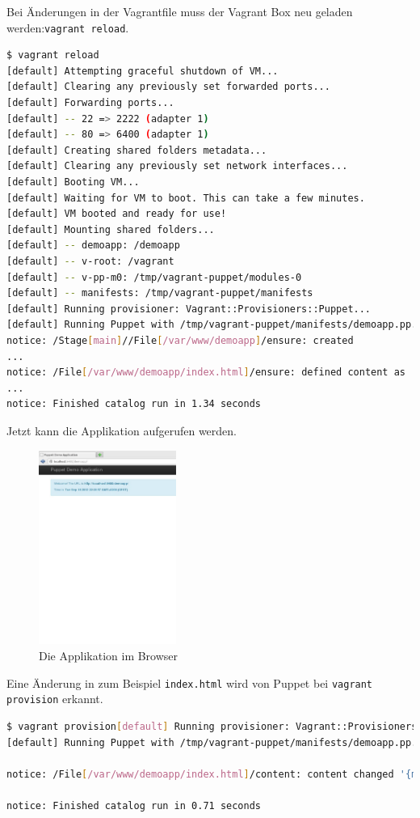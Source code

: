 \documentclass[12pt,a4paper,ngerman]{article}
\begin{document}
Bei Änderungen in der Vagrantfile muss der Vagrant Box neu geladen werden:\lstinline$vagrant reload$.
\begin{lstlisting}[language=sh,caption=Puppet reload mit Provisioning der Applikation, label=reloaddemoapp]
$ vagrant reload
[default] Attempting graceful shutdown of VM...
[default] Clearing any previously set forwarded ports...
[default] Forwarding ports...
[default] -- 22 => 2222 (adapter 1)
[default] -- 80 => 6400 (adapter 1)
[default] Creating shared folders metadata...
[default] Clearing any previously set network interfaces...
[default] Booting VM...
[default] Waiting for VM to boot. This can take a few minutes.
[default] VM booted and ready for use!
[default] Mounting shared folders...
[default] -- demoapp: /demoapp
[default] -- v-root: /vagrant
[default] -- v-pp-m0: /tmp/vagrant-puppet/modules-0
[default] -- manifests: /tmp/vagrant-puppet/manifests
[default] Running provisioner: Vagrant::Provisioners::Puppet...
[default] Running Puppet with /tmp/vagrant-puppet/manifests/demoapp.pp...
notice: /Stage[main]//File[/var/www/demoapp]/ensure: created
...
notice: /File[/var/www/demoapp/index.html]/ensure: defined content as '{md5}90a8d419b9c7b43b09ba73abebaf8f4c'
...
notice: Finished catalog run in 1.34 seconds
\end{lstlisting}

Jetzt kann die Applikation aufgerufen werden.
\begin{figure}
  \begin{center}
    \includegraphics[width=0.4\textwidth]{images/demoapp.pdf}
  \end{center}
  \caption{Die Applikation im Browser}
  \label{demoapp}
\end{figure}

Eine Änderung in zum Beispiel \lstinline$index.html$ wird von Puppet bei \lstinline$vagrant provision$ erkannt.
\begin{lstlisting}[language=sh,caption=Puppet Provisioning nach Änderung von index.html, label=provisionapp]
$ vagrant provision[default] Running provisioner: Vagrant::Provisioners::Puppet...
[default] Running Puppet with /tmp/vagrant-puppet/manifests/demoapp.pp...

notice: /File[/var/www/demoapp/index.html]/content: content changed '{md5}90a8d419b9c7b43b09ba73abebaf8f4c' to '{md5}0a4ee5bb63c3e5c29cc54cf36a4be23c'

notice: Finished catalog run in 0.71 seconds
\end{lstlisting}
\end{document}
